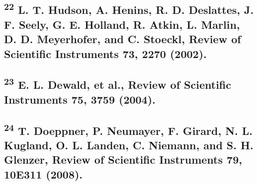 \subsection{\texorpdfstring{\textsuperscript{22} L. T. Hudson, A.
Henins, R. D. Deslattes, J. F. Seely, G. E. Holland, R. Atkin, L.
Marlin, D. D. Meyerhofer, and C. Stoeckl, Review of Scientific
Instruments 73, 2270
(2002).}{22 L. T. Hudson, A. Henins, R. D. Deslattes, J. F. Seely, G. E. Holland, R. Atkin, L. Marlin, D. D. Meyerhofer, and C. Stoeckl, Review of Scientific Instruments 73, 2270 (2002).}}\label{l.-t.-hudson-a.-henins-r.-d.-deslattes-j.-f.-seely-g.-e.-holland-r.-atkin-l.-marlin-d.-d.-meyerhofer-and-c.-stoeckl-review-of-scientific-instruments-73-2270-2002.}

\subsection{\texorpdfstring{\textsuperscript{23} E. L. Dewald, et al.,
Review of Scientific Instruments 75, 3759
(2004).}{23 E. L. Dewald, et al., Review of Scientific Instruments 75, 3759 (2004).}}\label{e.-l.-dewald-et-al.-review-of-scientific-instruments-75-3759-2004.}

\subsection{\texorpdfstring{\textsuperscript{24} T. Doeppner, P.
Neumayer, F. Girard, N. L. Kugland, O. L. Landen, C. Niemann, and S. H.
Glenzer, Review of Scientific Instruments 79, 10E311
(2008).}{24 T. Doeppner, P. Neumayer, F. Girard, N. L. Kugland, O. L. Landen, C. Niemann, and S. H. Glenzer, Review of Scientific Instruments 79, 10E311 (2008).}}\label{t.-doeppner-p.-neumayer-f.-girard-n.-l.-kugland-o.-l.-landen-c.-niemann-and-s.-h.-glenzer-review-of-scientific-instruments-79-10e311-2008.}



